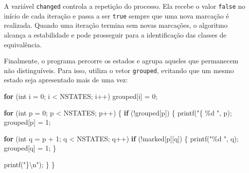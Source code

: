 \documentclass[
  brazilian,
  letterpaper,
]{book}
\newenvironment{Shaded}{\begin{snugshade}}{\end{snugshade}}
\newcommand{\ControlFlowTok}[1]{\textcolor[rgb]{0.00,0.23,0.31}{\textbf{#1}}}
\newcommand{\DataTypeTok}[1]{\textcolor[rgb]{0.68,0.00,0.00}{#1}}
\newcommand{\DecValTok}[1]{\textcolor[rgb]{0.68,0.00,0.00}{#1}}
\newcommand{\NormalTok}[1]{\textcolor[rgb]{0.00,0.23,0.31}{#1}}
\newcommand{\OperatorTok}[1]{\textcolor[rgb]{0.37,0.37,0.37}{#1}}
\newcommand{\SpecialCharTok}[1]{\textcolor[rgb]{0.37,0.37,0.37}{#1}}
\newcommand{\StringTok}[1]{\textcolor[rgb]{0.13,0.47,0.30}{#1}}
\theoremstyle{plain}
\theoremstyle{definition}
\theoremstyle{remark}
\begin{document}
A variável \texttt{changed} controla a repetição do processo. Ela recebe
o valor \texttt{false} no início de cada iteração e passa a ser
\texttt{true} sempre que uma nova marcação é realizada. Quando uma
iteração termina sem novas marcações, o algoritmo alcança a estabilidade
e pode prosseguir para a identificação das classes de equivalência.

Finalmente, o programa percorre os estados e agrupa aqueles que
permanecem não distinguíveis. Para isso, utiliza o vetor
\texttt{grouped}, evitando que um mesmo estado seja apresentado mais de
uma vez:

\begin{Shaded}
\begin{Highlighting}[]
\ControlFlowTok{for} \OperatorTok{(}\DataTypeTok{int}\NormalTok{ i }\OperatorTok{=} \DecValTok{0}\OperatorTok{;}\NormalTok{ i }\OperatorTok{\textless{}}\NormalTok{ NSTATES}\OperatorTok{;}\NormalTok{ i}\OperatorTok{++)}
\NormalTok{    grouped}\OperatorTok{[}\NormalTok{i}\OperatorTok{]} \OperatorTok{=} \DecValTok{0}\OperatorTok{;}

\ControlFlowTok{for} \OperatorTok{(}\DataTypeTok{int}\NormalTok{ p }\OperatorTok{=} \DecValTok{0}\OperatorTok{;}\NormalTok{ p }\OperatorTok{\textless{}}\NormalTok{ NSTATES}\OperatorTok{;}\NormalTok{ p}\OperatorTok{++)}
\OperatorTok{\{}
    \ControlFlowTok{if} \OperatorTok{(!}\NormalTok{grouped}\OperatorTok{[}\NormalTok{p}\OperatorTok{])}
    \OperatorTok{\{}
\NormalTok{        printf}\OperatorTok{(}\StringTok{"\{ }\SpecialCharTok{\%d}\StringTok{ "}\OperatorTok{,}\NormalTok{ p}\OperatorTok{);}
\NormalTok{        grouped}\OperatorTok{[}\NormalTok{p}\OperatorTok{]} \OperatorTok{=} \DecValTok{1}\OperatorTok{;}

        \ControlFlowTok{for} \OperatorTok{(}\DataTypeTok{int}\NormalTok{ q }\OperatorTok{=}\NormalTok{ p }\OperatorTok{+} \DecValTok{1}\OperatorTok{;}\NormalTok{ q }\OperatorTok{\textless{}}\NormalTok{ NSTATES}\OperatorTok{;}\NormalTok{ q}\OperatorTok{++)}
            \ControlFlowTok{if} \OperatorTok{(!}\NormalTok{marked}\OperatorTok{[}\NormalTok{p}\OperatorTok{][}\NormalTok{q}\OperatorTok{])}
            \OperatorTok{\{}
\NormalTok{                printf}\OperatorTok{(}\StringTok{"}\SpecialCharTok{\%d}\StringTok{ "}\OperatorTok{,}\NormalTok{ q}\OperatorTok{);}
\NormalTok{                grouped}\OperatorTok{[}\NormalTok{q}\OperatorTok{]} \OperatorTok{=} \DecValTok{1}\OperatorTok{;}
            \OperatorTok{\}}

\NormalTok{        printf}\OperatorTok{(}\StringTok{"\}}\SpecialCharTok{\textbackslash{}n}\StringTok{"}\OperatorTok{);}
    \OperatorTok{\}}
\OperatorTok{\}}
\end{Highlighting}
\end{Shaded}
\end{document}

